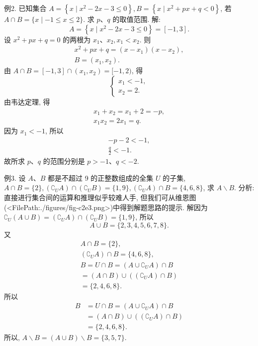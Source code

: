 例2. 已知集合 $A=\left\{x \mid x^2-2 x-3 \leqslant 0\right\}, B=\left\{x \mid x^2+p x+q<0\right\}$, 若 $A \cap B=\{x \mid-1 \leqslant x \leqslant 2\}$. 求 $p 、 q$ 的取值范围.
解:
$$
A=\left\{x \mid x^2-2 x-3 \leqslant 0\right\}=[-1,3] .
$$
设 $x^2+p x+q=0$ 的两根为 $x_1 、 x_2, x_1<x_2$. 则
$$
\begin{gathered}
x^2+p x+q=\left(x-x_1\right)\left(x-x_2\right), \\
B=\left(x_1, x_2\right) .
\end{gathered}
$$
由 $A \cap B=[-1,3] \cap\left(x_1, x_2\right)=[-1,2)$, 得
$$
\left\{\begin{array}{l}
x_1<-1, \\
x_2=2 .
\end{array}\right.
$$
由韦达定理, 得
$$
\begin{gathered}
x_1+x_2=x_1+2=-p, \\
x_1 x_2=2 x_1=q .
\end{gathered}
$$
因为 $x_1<-1$, 所以
$$
\begin{gathered}
-p-2<-1, \\
\frac{q}{2}<-1 .
\end{gathered}
$$
故所求 $p 、 q$ 的范围分别是 $p>-1 、 q<-2$.



例3. 设 $A 、 B$ 都是不超过 9 的正整数组成的全集 $U$ 的子集, $A \cap B= \{2\},\left(\complement_U A\right) \cap\left(\complement_U B\right)=\{1,9\},\left(\complement_U A\right) \cap B=\{4,6,8\}$, 求 $A \backslash B$.
分析:直接进行集合间的运算和推理似乎较难人手, 但我们可从维恩图(<FilePath:./figures/fig-c2e3.png>)中得到解题思路的提示.
解因为 $\complement_U(A \cup B)=\left(\complement_U A\right) \cap\left(\complement_U B\right)= \{1,9\}$, 所以
$$
A \cup B=\{2,3,4,5,6,7,8\} .
$$
又
$$
\begin{gathered}
A \cap B=\{2\}, \\
\left(\complement_U A\right) \cap B=\{4,6,8\}, \\
B=U \cap B=\left(A \cup \complement_U A\right) \cap B \\
=(A \cap B) \cup\left(\left(\complement_U A\right) \cap B\right) \\
=\{2,4,6,8\} .
\end{gathered}
$$
所以
$$
\begin{aligned}
B & =U \cap B=\left(A \cup \complement_U A\right) \cap B \\
& =(A \cap B) \cup\left(\left(\complement_U A\right) \cap B\right) \\
& =\{2,4,6,8\} .
\end{aligned}
$$
所以, $A \backslash B=(A \cup B) \backslash B=\{3,5,7\}$.



